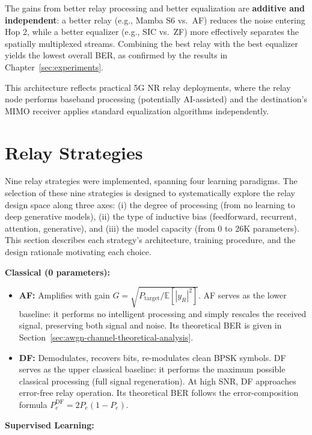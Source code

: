 The gains from better relay processing and better equalization are \textbf{additive and independent}: a better relay (e.g., Mamba S6 vs.~AF) reduces the noise entering Hop 2, while a better equalizer (e.g., SIC vs.~ZF) more effectively separates the spatially multiplexed streams. Combining the best relay with the best equalizer yields the lowest overall BER, as confirmed by the results in Chapter~\ref{sec:experiments}.

This architecture reflects practical 5G NR relay deployments, where the relay node performs baseband processing (potentially AI-assisted) and the destination's MIMO receiver applies standard equalization algorithms independently.

\section{Relay Strategies}\label{sec:relay-strategies}

Nine relay strategies were implemented, spanning four learning paradigms. The selection of these nine strategies is designed to systematically explore the relay design space along three axes: (i) the degree of processing (from no learning to deep generative models), (ii) the type of inductive bias (feedforward, recurrent, attention, generative), and (iii) the model capacity (from 0 to 26K parameters). This section describes each strategy's architecture, training procedure, and the design rationale motivating each choice.

\textbf{Classical (0 parameters):}

\begin{itemize}
\item
  \textbf{AF:} Amplifies with gain \(G = \sqrt{P_{\text{target}} / \mathbb{E}[|y_R|^2]}\). AF serves as the lower baseline: it performs no intelligent processing and simply rescales the received signal, preserving both signal and noise. Its theoretical BER is given in Section~\ref{sec:awgn-channel-theoretical-analysis}.
\item
  \textbf{DF:} Demodulates, recovers bits, re-modulates clean BPSK symbols. DF serves as the upper classical baseline: it performs the maximum possible classical processing (full signal regeneration). At high SNR, DF approaches error-free relay operation. Its theoretical BER follows the error-composition formula \(P_e^{\text{DF}} = 2P_e(1-P_e)\).
\end{itemize}

\textbf{Supervised Learning:}

